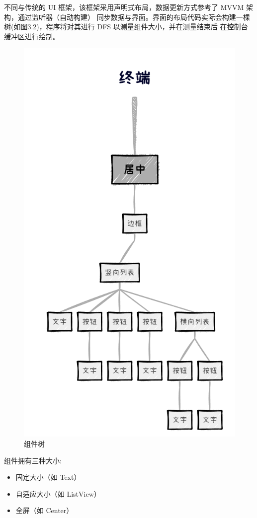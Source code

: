 \documentclass{ctexrep}
\begin{document}
不同与传统的 UI 框架，该框架采用声明式布局，数据更新方式参考了 MVVM 架构，通过监听器（自动构建）
同步数据与界面。界面的布局代码实际会构建一棵树(如图3.2)，程序将对其进行 DFS 以测量组件大小，并在测量结束后
在控制台缓冲区进行绘制。
\begin{figure}[!h]
  \centering
  \includegraphics[scale=0.5]{tree.png}
  \caption{组件树}
\end{figure}
组件拥有三种大小:
\begin{itemize}
  \item 固定大小（如 Text）
  \item 自适应大小（如 ListView）
  \item 全屏（如 Center）
\end{itemize}
\end{document}
